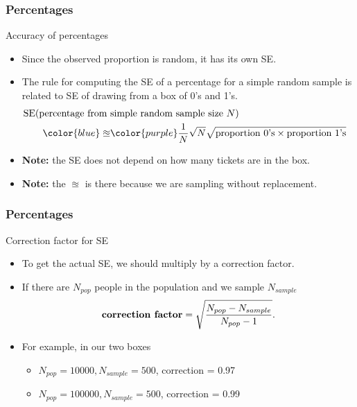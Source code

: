 \documentclass[handout]{beamer}
\begin{document}
   \begin{frame} \frametitle{Percentages}

   \begin{block}
   {Accuracy of percentages}
   \begin{itemize}
   \item Since the observed proportion is random, it has its own SE.
   \item The rule for computing the SE of a percentage
   for a simple random sample is related to SE of drawing
   from a box of 0's and 1's.
   $$
   \begin{aligned}
   \lefteqn{\text{SE(percentage from simple random sample size $N$)}} \\
   & \qquad {\color{blue} \approxeq} {\color{purple} \frac{1}{N} } \sqrt{N} \sqrt{\text{proportion 0's} \times \text{proportion 1's}}
   \end{aligned}
   $$

   \item {\bf Note:} the SE does not depend on how many tickets are in the box.
   \item {\bf Note:} the {\color{blue} $\approxeq$} is there because
   we are sampling without replacement.
   \end{itemize}
   \end{block}
   \end{frame}


   \begin{frame} \frametitle{Percentages}

   \begin{block}
   {Correction factor for SE}
   \begin{itemize}
   \item To get the actual SE, we should multiply by a correction factor.
   \item If there are $N_{pop}$ people in the population
   and we sample $N_{sample}$
   $$
   \text{{\bf correction factor}} = \sqrt{\frac{N_{pop}-N_{sample}}{N_{pop}-1}}.
   $$
   \item For example, in our two boxes
   \begin{itemize}
   \item $N_{pop}=10000, N_{sample}=500$, correction = 0.97
   \item $N_{pop}=100000, N_{sample}=500$, correction = 0.99
   \end{itemize}
   \end{itemize}
   \end{block}
   \end{frame}
\end{document}
